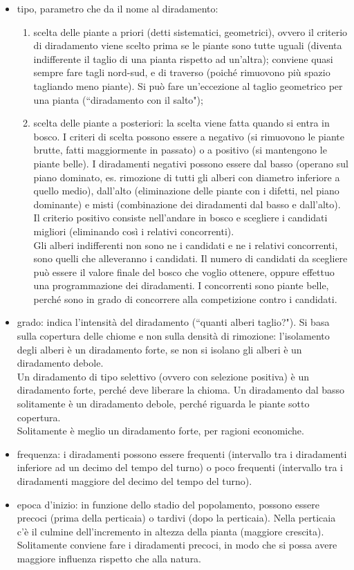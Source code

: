 \begin{itemize}[nosep]
    \item tipo, parametro che da il nome al diradamento:
    \begin{enumerate}[nosep]
        \item scelta delle piante a priori (detti sistematici, geometrici), ovvero il criterio di diradamento viene scelto prima se le piante sono tutte uguali (diventa indifferente il taglio di una pianta rispetto ad un'altra); conviene quasi sempre fare tagli nord-sud, e di traverso (poiché rimuovono più spazio tagliando meno piante). Si può fare un'eccezione al taglio geometrico per una pianta (``diradamento con il salto");
        \item scelta delle piante a posteriori: la scelta viene fatta quando si entra in bosco. I criteri di scelta possono essere a negativo (si rimuovono le piante brutte, fatti maggiormente in passato) o a positivo (si mantengono le piante belle). I diradamenti negativi possono essere dal basso (operano sul piano dominato, es. rimozione di tutti gli alberi con diametro inferiore a quello medio), dall'alto (eliminazione delle piante con i difetti, nel piano dominante) e misti (combinazione dei diradamenti dal basso e dall'alto). Il criterio positivo consiste nell'andare in bosco e scegliere i candidati migliori (eliminando così i relativi concorrenti).\\
        Gli alberi indifferenti non sono ne i candidati e ne i relativi concorrenti, sono quelli che alleveranno i candidati. Il numero di candidati da scegliere può essere il valore finale del bosco che voglio ottenere, oppure effettuo una programmazione dei diradamenti. I concorrenti sono piante belle, perché sono in grado di concorrere alla competizione contro i candidati. 
    \end{enumerate}
    \item grado: indica l'intensità del diradamento (``quanti alberi taglio?"). Si basa sulla copertura delle chiome e non sulla densità di rimozione: l'isolamento degli alberi è un diradamento forte, se non si isolano gli alberi è un diradamento debole.\\
    Un diradamento di tipo selettivo (ovvero con selezione positiva) è un diradamento forte, perché deve liberare la chioma. Un diradamento dal basso solitamente è un diradamento debole, perché riguarda le piante sotto copertura.\\
    Solitamente è meglio un diradamento forte, per ragioni economiche. 
    \item frequenza: i diradamenti possono essere frequenti (intervallo tra i diradamenti inferiore ad un decimo del tempo del turno) o poco frequenti (intervallo tra i diradamenti maggiore del decimo del tempo del turno). 
    \item epoca d'inizio: in funzione dello stadio del popolamento, possono essere precoci (prima della perticaia) o tardivi (dopo la perticaia). Nella perticaia c'è il culmine dell'incremento in altezza della pianta (maggiore crescita). Solitamente conviene fare i diradamenti precoci, in modo che si possa avere maggiore influenza rispetto che alla natura.
\end{itemize}
